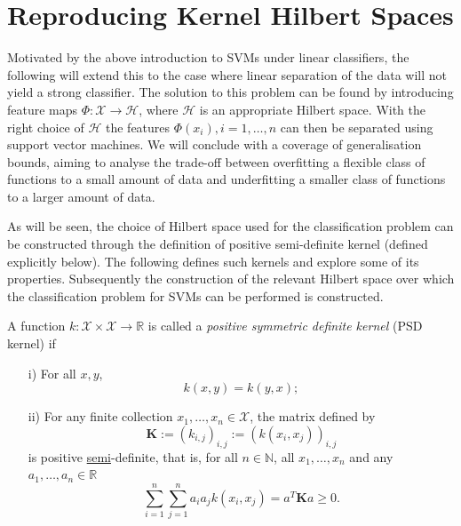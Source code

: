 %

\section{Reproducing Kernel Hilbert Spaces}

Motivated by the above introduction to SVMs under linear classifiers, the following will extend this to the case where linear separation of the data will not yield a strong classifier. The solution to this problem can be found by introducing feature maps $\Phi\colon \mathcal{X} \rightarrow \mathcal{H}$, where $\mathcal{H}$ is an appropriate Hilbert space. With the right choice of $\mathcal{H}$ the features $\Phi(x_i), i=1, \ldots, n$ can then be separated using support vector machines. We will conclude with a coverage of generalisation bounds, aiming to analyse the trade-off between overfitting a flexible class of functions to a small amount of data and underfitting a smaller class of functions to a larger amount of data. 

As will be seen, the choice of Hilbert space used for the classification problem can be constructed through the definition of positive semi-definite kernel (defined explicitly below).  The following defines such kernels and explore some of its properties. Subsequently the construction of the relevant Hilbert space over which the classification problem for SVMs can be performed is constructed. 

\begin{definition}
A function $k\colon \mathcal{X}\times \mathcal{X} \rightarrow \mathbb{R}$ is called a \emph{positive symmetric definite kernel} (PSD kernel) if 
\begin{itemize}
	\item[i)] For all $x, y$, $$k(x, y)=k(y, x);$$
	\item[ii)] For any finite collection $x_1, \ldots, x_n \in \mathcal{X}$, the matrix defined by
	\begin{equation}
		\mathbf{K} := (k_{i,j})_{i,j} := (k(x_i, x_j))_{i,j}
	\end{equation}
	is positive \underline{semi}-definite, that is, for all $n\in \mathbb{N}$, all $x_1, \ldots, x_n$ and any $a_1, \ldots, a_n \in \mathbb{R}$ 
	\begin{equation*}
	 \sum_{i=1}^n\sum_{j=1}^n a_ia_j k(x_i, x_j) = a^T\mathbf{K}a \geq 0.
	\end{equation*}
\end{itemize}
\end{definition}

